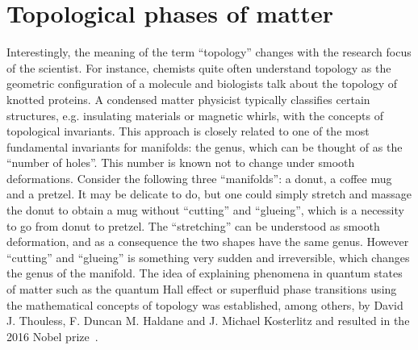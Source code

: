 %
%
\chapter{Topological phases of matter}
\label{ch:topological_phases_of_matter}
%
%
Interestingly, the meaning of the term ``topology'' changes with the research focus of the scientist.
For instance, chemists quite often understand topology as the geometric configuration of a molecule and biologists talk about the topology of knotted proteins.
A condensed matter physicist typically classifies certain structures, e.g. insulating materials or magnetic whirls, with the concepts of topological invariants.
This approach is closely related to one of the most fundamental invariants for manifolds: the genus, which can be thought of as the ``number of holes''.
This number is known not to change under smooth deformations.
Consider the following three ``manifolds'': a donut, a coffee mug and a pretzel.
It may be delicate to do, but one could simply stretch and massage the donut to obtain a mug without ``cutting'' and ``glueing'', which is a necessity to go from donut to pretzel.
The ``stretching'' can be understood as smooth deformation, and as a consequence the two shapes have the same genus.
However ``cutting'' and ``glueing'' is something very sudden and irreversible, which changes the genus of the manifold.
The idea of explaining phenomena in quantum states of matter such as the quantum Hall effect or superfluid phase transitions using the mathematical concepts of topology was established, among others, by David J. Thouless, F. Duncan M. Haldane and J. Michael Kosterlitz and resulted in the 2016 Nobel prize~\cite{NP2016}.

